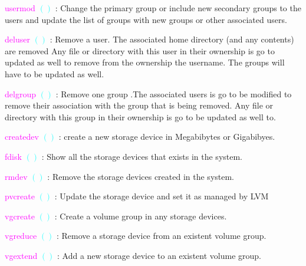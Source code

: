 \documentclass{aes2e}
\begin{document}
\begin{alphalist}[style=sameline]
\item{}\textcolor{Magenta}{usermod  } \textcolor{Cyan}{$()$} : Change the primary group or  include new secondary
groups to the users and update the list of groups with new groups or other associated users. \newline

\item{}\textcolor{Magenta}{deluser  } \textcolor{Cyan}{$()$} : Remove a user. The associated home directory (and any contents) are removed  Any file or directory with this user in their ownership is go to updated as well to remove from the ownership the username. The groups will have to be updated as well. \newline

\item{}\textcolor{Magenta}{delgroup  } \textcolor{Cyan}{$()$} : Remove one group .The associated users is go to be modified to remove their association with the group that is being removed. Any
file or directory with this group in their ownership is go to be updated as well to. \newline

\item{}\textcolor{Magenta}{createdev  } \textcolor{Cyan}{$()$} : create a new storage device in Megabibytes or Gigabibyes. \newline

\item{}\textcolor{Magenta}{fdisk  } \textcolor{Cyan}{$()$} : Show all the storage devices that exists in the system. \newline

\item{}\textcolor{Magenta}{rmdev  } \textcolor{Cyan}{$()$} : Remove the storage devices created in the system. \newline

\item{}\textcolor{Magenta}{pvcreate  } \textcolor{Cyan}{$()$} : Update the storage device and set it as managed by LVM  \newline

\item{}\textcolor{Magenta}{vgcreate  } \textcolor{Cyan}{$()$} : Create a volume group in any storage devices. \newline

\item{}\textcolor{Magenta}{vgreduce  } \textcolor{Cyan}{$()$} : Remove a storage device from an existent
volume group. \newline

\item{}\textcolor{Magenta}{vgextend   } \textcolor{Cyan}{$()$} : Add a new storage device to an existent volume group. 
\end{alphalist}
\end{document}
